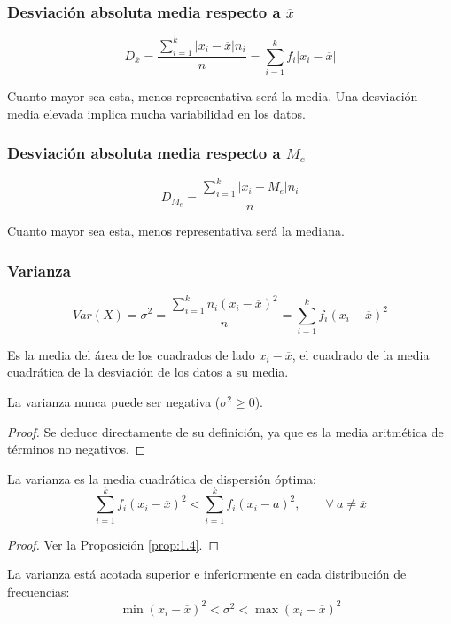 \subsubsection{Desviación absoluta media respecto a $\overline{x}$}
$$D_{\overline{x}} = \dfrac{\sum\limits_{i=1}^k |x_i - \overline{x}|n_i}{n} = \sum_{i=1}^k f_i |x_i - \overline{x}|$$

Cuanto mayor sea esta, menos representativa será la media. Una desviación media elevada implica mucha variabilidad en los datos.

\subsubsection{Desviación absoluta media respecto a $M_e$}
$$D_{M_e} = \dfrac{\sum\limits_{i=1}^k|x_i - M_e| n_i}{n}$$

Cuanto mayor sea esta, menos representativa será la mediana.

\subsubsection{Varianza}
\begin{equation*}
    Var(X)=\sigma^2 = \dfrac{\sum\limits_{i=1}^k n_i (x_i - \overline{x})^2}{n} = \sum_{i=1}^k f_i (x_i - \overline{x})^2
\end{equation*}

Es la media del área de los cuadrados de lado $x_i - \overline{x}$, el cuadrado de la media cuadrática de
la desviación de los datos a su media.\\


\begin{lema}
    La varianza nunca puede ser negativa ($\sigma^2 \geq 0$).
\end{lema}
\begin{proof}
    Se deduce directamente de su definición, ya que es la media aritmética de términos no negativos.
\end{proof}

\begin{prop}
    La varianza es la media cuadrática de dispersión óptima:
    $$\sum\limits_{i=1}^k f_i(x_i - \overline{x})^2 < \sum\limits_{i=1}^k f_i(x_i - a)^2,\qquad \forall~a \neq \overline{x}$$
\end{prop}
\begin{proof}
    Ver la Proposición \ref{prop:1.4}.
\end{proof}

\begin{prop}
    La varianza está acotada superior e inferiormente en cada distribución de frecuencias:
    $$\min(x_i - \overline{x})^2 < \sigma^2 < \max(x_i - \overline{x})^2$$
\end{prop}

